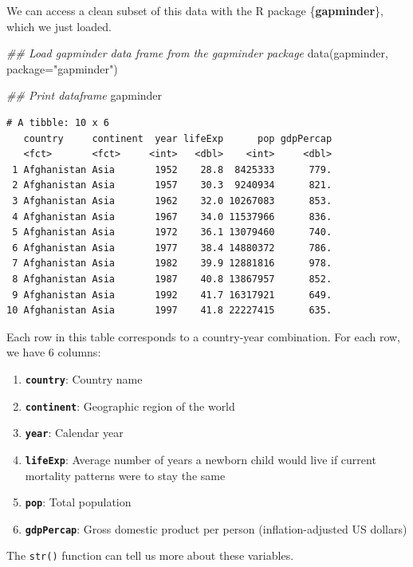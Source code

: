 \documentclass[
  letterpaper,
  DIV=11,
  numbers=noendperiod]{scrreprt}
\newenvironment{Shaded}{\begin{snugshade}}{\end{snugshade}}
\newcommand{\AttributeTok}[1]{\textcolor[rgb]{0.40,0.45,0.13}{#1}}
\newcommand{\DocumentationTok}[1]{\textcolor[rgb]{0.37,0.37,0.37}{\textit{#1}}}
\newcommand{\FunctionTok}[1]{\textcolor[rgb]{0.28,0.35,0.67}{#1}}
\newcommand{\NormalTok}[1]{\textcolor[rgb]{0.00,0.23,0.31}{#1}}
\newcommand{\StringTok}[1]{\textcolor[rgb]{0.13,0.47,0.30}{#1}}
\begin{document}
We can access a clean subset of this data with the R package
\{\textbf{gapminder}\}, which we just loaded.

\begin{Shaded}
\begin{Highlighting}[]
\DocumentationTok{\#\# Load gapminder data frame from the gapminder package}
\FunctionTok{data}\NormalTok{(gapminder, }\AttributeTok{package=}\StringTok{"gapminder"}\NormalTok{)}

\DocumentationTok{\#\# Print dataframe}
\NormalTok{gapminder}
\end{Highlighting}
\end{Shaded}

\begin{verbatim}
# A tibble: 10 x 6
   country     continent  year lifeExp      pop gdpPercap
   <fct>       <fct>     <int>   <dbl>    <int>     <dbl>
 1 Afghanistan Asia       1952    28.8  8425333      779.
 2 Afghanistan Asia       1957    30.3  9240934      821.
 3 Afghanistan Asia       1962    32.0 10267083      853.
 4 Afghanistan Asia       1967    34.0 11537966      836.
 5 Afghanistan Asia       1972    36.1 13079460      740.
 6 Afghanistan Asia       1977    38.4 14880372      786.
 7 Afghanistan Asia       1982    39.9 12881816      978.
 8 Afghanistan Asia       1987    40.8 13867957      852.
 9 Afghanistan Asia       1992    41.7 16317921      649.
10 Afghanistan Asia       1997    41.8 22227415      635.
\end{verbatim}

Each row in this table corresponds to a country-year combination. For
each row, we have 6 columns:

\begin{enumerate}
\def\labelenumi{\arabic{enumi})}
\item
  \textbf{\texttt{country}}: Country name
\item
  \textbf{\texttt{continent}}: Geographic region of the world
\item
  \textbf{\texttt{year}}: Calendar year
\item
  \textbf{\texttt{lifeExp}}: Average number of years a newborn child
  would live if current mortality patterns were to stay the same
\item
  \textbf{\texttt{pop}}: Total population
\item
  \textbf{\texttt{gdpPercap}}: Gross domestic product per person
  (inflation-adjusted US dollars)
\end{enumerate}

The \texttt{str()} function can tell us more about these variables.
\end{document}
